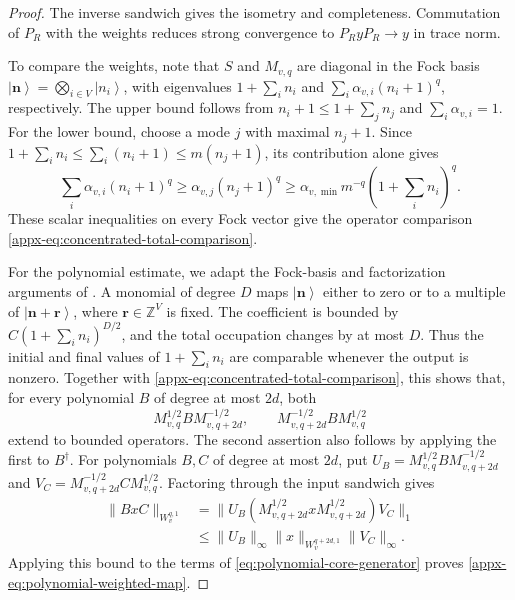\documentclass[11pt]{article}
\theoremstyle{myplain}
\theoremstyle{mydefinition}
\theoremstyle{remark}
\DeclareMathOperator{\1}{\mathds{1}}
\newcommand{\ket}[1]{\left\vert #1 \right\rangle}
\begin{document}
    \begin{proof}
        The inverse sandwich gives the isometry and completeness. Commutation of $P_R$ with the weights reduces strong convergence to $P_R y P_R \to y$ in trace norm.

        To compare the weights, note that $S$ and $M_{v,q}$ are diagonal in the Fock basis $\ket{\boldsymbol n} = \bigotimes_{i \in V} \ket{n_i}$, with eigenvalues $1 + \sum_i n_i$ and $\sum_i \alpha_{v,i}(n_i + 1)^q$, respectively. The upper bound follows from $n_i + 1 \leq 1 + \sum_j n_j$ and $\sum_i \alpha_{v,i} = 1$. For the lower bound, choose a mode $j$ with maximal $n_j + 1$. Since $1 + \sum_i n_i \leq \sum_i(n_i + 1) \leq m(n_j + 1)$, its contribution alone gives
        \begin{equation*}
            \sum_i \alpha_{v,i}(n_i + 1)^q
            \geq \alpha_{v,j}(n_j + 1)^q
            \geq \alpha_{v,\min} m^{-q} \left(1 + \sum_i n_i\right)^q.
        \end{equation*}
        These scalar inequalities on every Fock vector give the operator comparison \eqref{appx-eq:concentrated-total-comparison}.

        For the polynomial estimate, we adapt the Fock-basis and factorization arguments of \cite[Lem.~E.2 and proof of Lem.~E.3]{Gondolf.2024}. A monomial of degree $D$ maps $\ket{\boldsymbol n}$ either to zero or to a multiple of $\ket{\boldsymbol n + \boldsymbol r}$, where $\boldsymbol r \in \mathbb Z^V$ is fixed. The coefficient is bounded by $C(1 + \sum_i n_i)^{D/2}$, and the total occupation changes by at most $D$. Thus the initial and final values of $1 + \sum_i n_i$ are comparable whenever the output is nonzero. Together with \eqref{appx-eq:concentrated-total-comparison}, this shows that, for every polynomial $B$ of degree at most $2d$, both
        \begin{equation*}
            M_{v,q}^{1/2} B M_{v,q+2d}^{-1/2}, \qquad
            M_{v,q+2d}^{-1/2} B M_{v,q}^{1/2}
        \end{equation*}
        extend to bounded operators. The second assertion also follows by applying the first to $B^\dagger$. For polynomials $B,C$ of degree at most $2d$, put $U_B=M_{v,q}^{1/2}BM_{v,q+2d}^{-1/2}$ and $V_C=M_{v,q+2d}^{-1/2}CM_{v,q}^{1/2}$. Factoring through the input sandwich gives
        \begin{equation*}
            \begin{aligned}
                \|BxC\|_{W_v^{q,1}}
                &=\|U_B(M_{v,q+2d}^{1/2}xM_{v,q+2d}^{1/2})V_C\|_1\\
                &\leq\|U_B\|_\infty\|x\|_{W_v^{q+2d,1}}\|V_C\|_\infty.
            \end{aligned}
        \end{equation*}
        Applying this bound to the terms of \eqref{eq:polynomial-core-generator} proves \eqref{appx-eq:polynomial-weighted-map}.


\end{proof}
\end{document}
